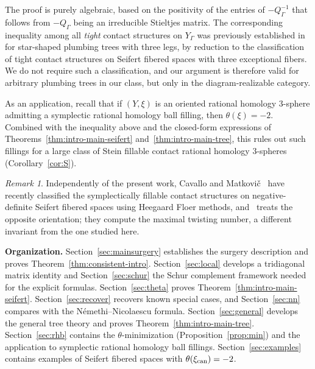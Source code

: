 \documentclass[11pt]{amsart}
\theoremstyle{plain}
\theoremstyle{definition}
\theoremstyle{remark}
\newtheorem{remark}[theorem]{Remark}
\begin{document}
The proof is purely algebraic, based on the positivity of the entries
of $-Q_\Gamma^{-1}$ that follows from $-Q_\Gamma$ being an irreducible
Stieltjes matrix. The corresponding inequality among all
\emph{tight} contact structures on $Y_\Gamma$ was previously
established in~\cite[Proposition~1.7]{EtnyreOzbagciTosun2025} for star-shaped
plumbing trees with three legs, by reduction to the classification of
tight contact structures on Seifert fibered spaces with three
exceptional fibers. We do not require such a classification, and our
argument is therefore valid for arbitrary plumbing trees in our
class, but only in the diagram-realizable category.

As an application, recall that if $(Y,\xi)$ is an oriented rational
homology $3$-sphere admitting a symplectic rational homology ball
filling, then $\theta(\xi)=-2$. Combined with the inequality above
and the closed-form expressions of Theorems~\ref{thm:intro-main-seifert}
and~\ref{thm:intro-main-tree}, this rules out such fillings for a
large class of Stein fillable contact rational homology $3$-spheres
(Corollary~\ref{cor:S}).

\begin{remark}
Independently of the present work, Cavallo and
Matkovi\v{c}~\cite{CavalloMatkovic2026b} have recently classified the
symplectically fillable  contact structures on
negative-definite Seifert fibered spaces using Heegaard Floer
methods, and~\cite{CavalloMatkovic2026a} treats the opposite
orientation; they compute the maximal twisting number, a different
invariant from the one studied here.
\end{remark}

\medskip\noindent\textbf{Organization.}
Section~\ref{sec:mainsurgery} establishes the surgery description and
proves Theorem~\ref{thm:consistent-intro}. Section~\ref{sec:local} develops
a tridiagonal matrix identity and Section~\ref{sec:schur} the Schur
complement framework needed for the explicit formulas.
Section~\ref{sec:theta} proves
Theorem~\ref{thm:intro-main-seifert}.
Section~\ref{sec:recover} recovers known special cases, and
Section~\ref{sec:nn} compares with the N\'emethi--Nicolaescu formula.
Section~\ref{sec:general} develops the general tree theory and proves
Theorem~\ref{thm:intro-main-tree}. Section~\ref{sec:rhb} contains the
$\theta$-minimization (Proposition~\ref{prop:min}) and the application to symplectic rational
homology ball fillings. Section~\ref{sec:examples} contains examples of Seifert fibered spaces with $\theta(\xi_{\rm can})=-2$.
\end{document}
